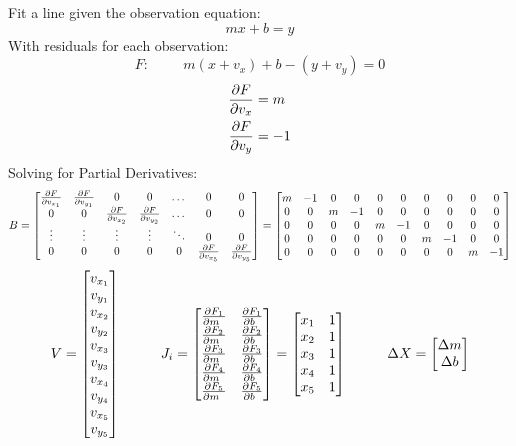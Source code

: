 Fit a line given the observation equation:
\[
mx + b = y 
\]
With residuals for each observation:
\[
F: \hspace{1cm} m(x+v_x) + b - (y+v_y) = 0 
\]
\begin{align*}
\frac{\partial F}{\partial v_x} &= m \\
\frac{\partial F}{\partial v_y} &= -1\\
\end{align*}
Solving for Partial Derivatives:
\[
B = 
\begin{bmatrix}
\frac{\partial F}{\partial v_{x_1}} & \frac{\partial F}{\partial v_{y_1}} & 0 & 0 & \dots & 0 & 0 \\
0 & 0 & \frac{\partial F}{\partial v_{x_2}} & \frac{\partial F}{\partial v_{y_2}} &  \dots  & 0 & 0 \\
\vdots & \vdots & \vdots & \vdots & \ddots & 0 & 0 \\
0 & 0 & 0 & 0 & 0 & \frac{\partial F}{\partial v_{x_5}} & \frac{\partial F}{\partial v_{y_5}} \\
\end{bmatrix}
=
\begin{bmatrix}
m & -1 & 0 & 0 & 0 & 0 & 0 & 0 & 0 & 0 \\
0 & 0 & m & -1 & 0 & 0 & 0 & 0 & 0 & 0 \\
0 & 0 & 0 & 0 & m & -1 & 0 & 0 & 0 & 0 \\
0 & 0 & 0 & 0 & 0 & 0 & m & -1 & 0 & 0 \\
0 & 0 & 0 & 0 & 0 & 0 & 0 & 0 & m & -1 \\
\end{bmatrix}
\]
\[
V = 
\begin{bmatrix}
v_{x_1} \\
v_{y_1} \\
v_{x_2} \\
v_{y_2} \\
v_{x_3} \\
v_{y_3} \\
v_{x_4} \\
v_{y_4} \\
v_{x_5} \\
v_{y_5} \\
\end{bmatrix}
\hspace{1cm}
J_i = \begin{bmatrix}
\frac{\partial F_1}{\partial m_{\phantom{0}}} & \frac{\partial F_1}{\partial b_{\phantom{0}}} \\
\frac{\partial F_2}{\partial m_{\phantom{0}}} & \frac{\partial F_2}{\partial b_{\phantom{0}}} \\
\frac{\partial F_3}{\partial m_{\phantom{0}}} & \frac{\partial F_3}{\partial b_{\phantom{0}}} \\
\frac{\partial F_4}{\partial m_{\phantom{0}}} & \frac{\partial F_4}{\partial b_{\phantom{0}}} \\
\frac{\partial F_5}{\partial m_{\phantom{0}}} & \frac{\partial F_5}{\partial b_{\phantom{0}}} \\
\end{bmatrix}
=
\begin{bmatrix}
x_1 & 1 \\
x_2 & 1 \\
x_3 & 1 \\
x_4 & 1 \\
x_5 & 1 \\
\end{bmatrix}
\hspace{1cm}
\Delta X = 
\begin{bmatrix}
\Delta m \\ \Delta b
\end{bmatrix}
\]
